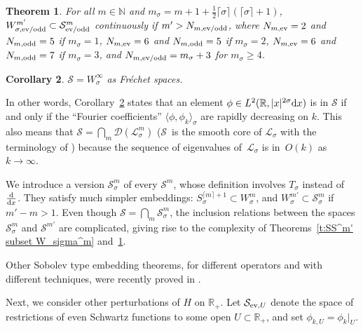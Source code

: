 \documentclass[11pt]{article}
\newtheorem{Theorem}{Theorem}[section]
\newtheorem{Corollary}[Theorem]{Corollary}
\newcommand{\R}{\mathbb{R}}
\newcommand{\N}{\mathbb{N}}
\newcommand{\DD}{\mathcal{D}}
\newcommand{\LL}{\mathcal{L}}
\renewcommand{\SS}{\mathcal{S}}
\begin{document}
\begin{Theorem}\label{t:Sobolev}
  For all $m\in\N$ and $m_\sigma=m+1+\frac{1}{2}\lceil\sigma\rceil(\lceil\sigma\rceil+1)$, $W_{\sigma,\text{\rm ev/odd}}^{m'}\subset\SS_{\text{\rm ev/odd}}^m$ continuously if $m'>N_{m,\text{\rm ev/odd}}$, where $N_{m,\text{\rm ev}}=2$ and $N_{m,\text{\rm odd}}=5$ if $m_\sigma=1$, $N_{m,\text{\rm ev}}=6$ and $N_{m,\text{\rm odd}}=5$ if $m_\sigma=2$, $N_{m,\text{\rm ev}}=6$ and $N_{m,\text{\rm odd}}=7$ if $m_\sigma=3$, and $N_{m,\text{\rm ev/odd}}=m_\sigma+3$ for $m_\sigma\ge4$.
\end{Theorem}

\begin{Corollary}\label{c:SS=W_sigma^infty}
  $\SS=W_\sigma^\infty$ as Fr\'echet spaces.
\end{Corollary}

In other words, Corollary~\ref{c:SS=W_sigma^infty} states that an element $\phi\in L^2(\R,|x|^{2\sigma}{\rm d}x)$ is in $\SS$ if and only if the ``Fourier coef\/f\/icients'' $\langle\phi,\phi_k\rangle_\sigma$ are rapidly decreasing on $k$. This also means that $\SS=\bigcap_m\DD(\LL_\sigma^m)$ ($\SS$~is the smooth core of $\LL_\sigma$ with the terminology of \cite{BruningLesch1992}) because the sequence of eigenvalues of~$\LL_\sigma$ is in~$O(k)$ as~$k\to\infty$.

We introduce a version $\SS_\sigma^m$ of every $\SS^m$, whose def\/inition involves $T_\sigma$ instead of $\frac{{\rm d}}{{\rm d}x}$. They satisfy much simpler embeddings: $S_\sigma^{\lceil m\rceil+1}\subset W_\sigma^m$, and $W_\sigma^{m'}\subset\SS_\sigma^m$ if $m'-m>1$. Even though $\SS=\bigcap_m\SS_\sigma^m$, the inclusion relations between the spaces $\SS_\sigma^m$ and $\SS^{m'}$ are complicated, giving rise to the complexity of Theorems~\ref{t:SS^m' subset W_sigma^m} and~\ref{t:Sobolev}.

Other Sobolev type embedding theorems, for dif\/ferent operators and with dif\/ferent techniques, were recently proved in \cite{Watanabe1997,Watanabe2002,Watanabe2004}.

Next, we consider other perturbations of $H$ on $\R_+$. Let $\SS_{\text{\rm ev},U}$ denote the space of restrictions of even Schwartz functions to some open $U\subset\R_+$, and set $\phi_{k,U}=\phi_k|_U$.
\end{document}
